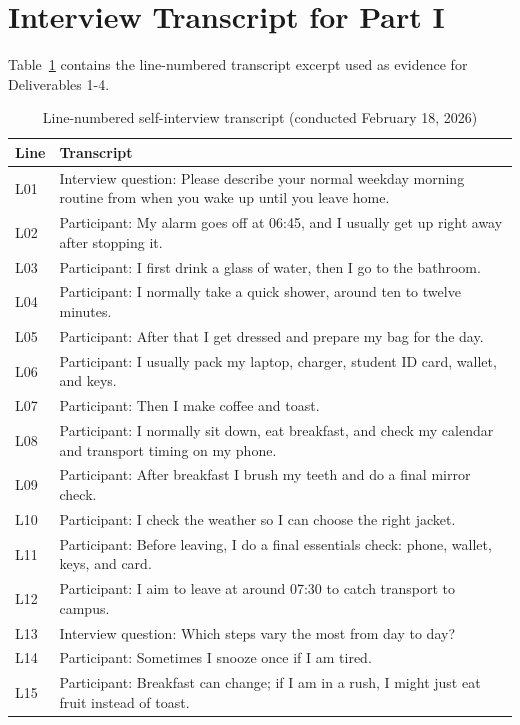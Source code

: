 \section{Interview Transcript for Part I}
\label{app:part1_transcript}

Table~\ref{tab:app_transcript_part1} contains the line-numbered transcript excerpt used as evidence for Deliverables 1-4.

\begin{table}[H]
\centering
\footnotesize
\caption{Line-numbered self-interview transcript (conducted February 18, 2026)}
\label{tab:app_transcript_part1}
\begin{tabularx}{\textwidth}{l X}
\toprule
Line & Transcript \\
\midrule
L01 & Interview question: Please describe your normal weekday morning routine from when you wake up until you leave home. \\
L02 & Participant: My alarm goes off at 06:45, and I usually get up right away after stopping it. \\
L03 & Participant: I first drink a glass of water, then I go to the bathroom. \\
L04 & Participant: I normally take a quick shower, around ten to twelve minutes. \\
L05 & Participant: After that I get dressed and prepare my bag for the day. \\
L06 & Participant: I usually pack my laptop, charger, student ID card, wallet, and keys. \\
L07 & Participant: Then I make coffee and toast. \\
L08 & Participant: I normally sit down, eat breakfast, and check my calendar and transport timing on my phone. \\
L09 & Participant: After breakfast I brush my teeth and do a final mirror check. \\
L10 & Participant: I check the weather so I can choose the right jacket. \\
L11 & Participant: Before leaving, I do a final essentials check: phone, wallet, keys, and card. \\
L12 & Participant: I aim to leave at around 07:30 to catch transport to campus. \\
L13 & Interview question: Which steps vary the most from day to day? \\
L14 & Participant: Sometimes I snooze once if I am tired. \\
L15 & Participant: Breakfast can change; if I am in a rush, I might just eat fruit instead of toast. \\

\end{tabularx}
\end{table}
